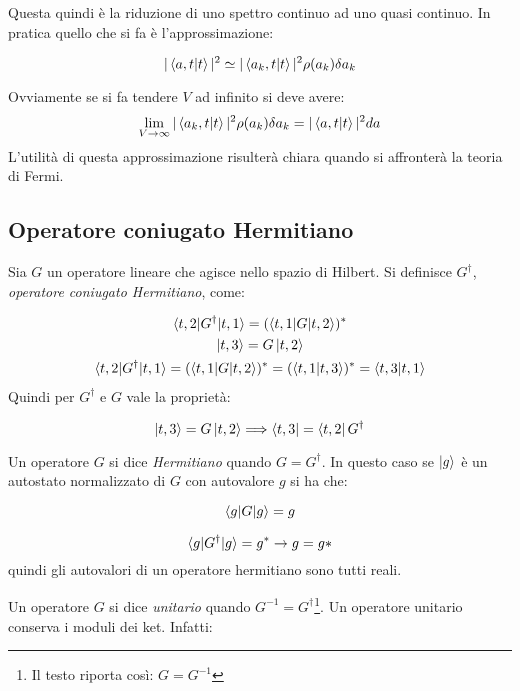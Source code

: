 Questa quindi è la riduzione di uno spettro continuo ad uno quasi continuo. In
pratica quello che si fa è l'approssimazione:

\begin{equation}
|\braket{a,t|t}|^2\simeq |\braket{a_k,t|t}|^2\rho(a_k)\delta a_k
\end{equation}

Ovviamente se si fa tendere $V$ ad infinito si deve avere:
\begin{equation}
\lim_{V\to\infty}|\braket{a_k,t|t}|^2\rho(a_k)\delta a_k = |\braket{a,t|t}|^2da
\end{equation}
L'utilità di questa approssimazione risulterà chiara quando si affronterà la 
teoria di Fermi.

\subsection{Operatore coniugato Hermitiano}
Sia $G$ un operatore lineare che agisce nello spazio di Hilbert. Si definisce 
$G^\dag$, \textit{operatore coniugato Hermitiano}, come:

\begin{gather}
\braket{t,2|G^{\dag}|t,1}=(\braket{t,1|G|t,2})^*\\
\ket{t,3}=G\ket{t,2}\\
\braket{t,2|G^{\dag}|t,1}=(\braket{t,1|G|t,2})^*=(\braket{t,1|t,3})^*=\braket{t,
3|t,1}
\end{gather}
Quindi per $G^{\dag}$ e $G$ vale la proprietà:

\begin{equation}
\ket{t,3}=G\ket{t,2} \Longrightarrow \bra{t,3}=\bra{t,2}G^{\dag}
\end{equation}

Un operatore $G$ si dice \textit{Hermitiano} quando $G=G^{\dag}$. In questo 
caso se $\ket{g}$ è un autostato normalizzato di $G$ con autovalore $g$ si ha 
che:

\begin{equation}
\braket{g|G|g}=g 
\end{equation}

\begin{equation}
\braket{g|G^{\dag}|g}=g^*\rightarrow g=g*
\end{equation}
quindi gli autovalori di un operatore hermitiano sono tutti reali.

Un operatore $G$ si dice \textit{unitario} quando $G^{-1}=G^{\dag}$\footnote{Il 
testo riporta così: $G=G^{-1}$}. Un operatore unitario conserva i moduli dei 
ket. Infatti:

